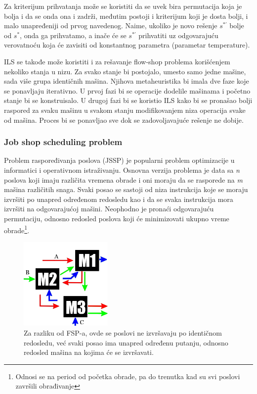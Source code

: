 \documentclass[a4paper]{article}
\newcommand{\sstar}[0]{$\textit{s}^*$}
\begin{document}
Za kriterijum prihvatanja može se koristiti da se uvek bira permutacija koja je bolja i da se onda ona i zadrži, međutim postoji i kriterijum koji je dosta bolji, i malo unapređeniji od prvog navedenog. Naime, ukoliko je novo rešenje $\textit{s}^{*\prime}$ bolje od \sstar{}, onda ga prihvatamo, a inače će se $\textit{s}^{*\prime}$ prihvatiti uz odgovarajuću verovatnoću
koja će zavisiti od konstantnog parametra  (parametar temperature).

ILS se takođe može koristiti i za rešavanje flow-shop problema korišćenjem nekoliko stanja u nizu. Za svako stanje bi postojalo, umesto samo jedne mašine, sada više grupa identičnih mašina. Njihova metaheuristika bi imala dve faze koje se ponavljaju iterativno. U prvoj fazi bi se operacije dodelile mašinama i početno stanje bi se konstruisalo. U drugoj fazi bi se koristio ILS kako bi se pronašao bolji raspored za svaku mašinu u svakom stanju modifikovanjem niza operacija svake od mašina. Proces bi se ponavljao sve dok se zadovoljavajuće rešenje ne dobije. \cite{applyingIteratedLocalSearchtothePermutation} 

\subsubsection{Job shop scheduling problem}
Problem raspoređivanja poslova (JSSP) je popularni problem optimizacije u informatici i operativnom istraživanju.
Osnovna verzija problema je data sa \textit{n} poslova koji imaju različita vremena obrade i oni moraju da se rasporede na \textit{m} mašina različitih snaga. Svaki posao se sastoji od niza instrukcija koje se moraju izvršiti po unapred određenom redosledu kao i da se svaka instrukcija mora izvršiti na odgovarajućoj mašini. Neophodno je pronaći odgovarajuću permutaciju, odnosno redosled poslova koji će minimizovati ukupno vreme obrade\footnote{Odnosi se na period od početka obrade, pa do trenutka kad su svi poslovi završili obrađivanje}.
\begin{figure}[h!]
  \centering
  \includegraphics[width=0.4\textwidth]{jobshop.png}
  \caption{Za razliku od FSP-a, ovde se poslovi ne izvršavaju po identičnom redosledu, već svaki posao ima unapred određenu putanju, odnosno redosled mašina na kojima će se izvršavati.}
  \label{figure:jssp}
\end{figure}
\end{document}
